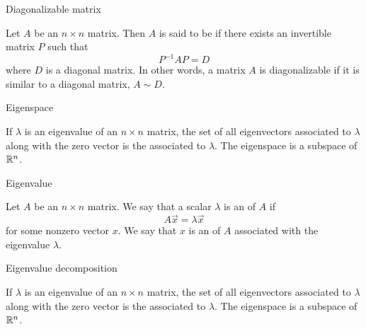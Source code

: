\documentclass{ximera}
\begin{document}
Diagonalizable matrix
\begin{expandable}
    Let $A$ be an $n\times n$ matrix. Then $A$ is said to be  if there exists an invertible matrix $P$ such that
\begin{equation*}
P^{-1}AP=D
\end{equation*}
where $D$ is a diagonal matrix.  In other words, a matrix $A$ is diagonalizable if it is similar to a diagonal matrix, $A \sim D$.
\end{expandable}


Eigenspace
\begin{expandable}
    If $\lambda$ is an eigenvalue of an $n \times n$ matrix, the set of all eigenvectors associated to $\lambda$ along with the zero vector is the  associated to $\lambda$.  The eigenspace is a subspace of $\mathbb{R}^n$.
\end{expandable}


Eigenvalue
\begin{expandable}
    Let $A$ be an $n \times n$ matrix.  We say that a scalar $\lambda$ is an  of $A$ if $$A\vec{x} = \lambda \vec{x}$$
for some nonzero vector $x$.
We say that $x$ is an  of $A$ associated with the eigenvalue $\lambda$.
\end{expandable}


Eigenvalue decomposition
\begin{expandable}
    If $\lambda$ is an eigenvalue of an $n \times n$ matrix, the set of all eigenvectors associated to $\lambda$ along with the zero vector is the  associated to $\lambda$.  The eigenspace is a subspace of $\mathbb{R}^n$.
\end{expandable}

\end{document}

